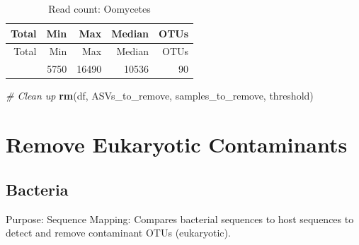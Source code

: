 \documentclass[
  11pt,
]{article}
\newenvironment{Shaded}{\begin{snugshade}}{\end{snugshade}}
\newcommand{\CommentTok}[1]{\textcolor[rgb]{0.56,0.35,0.01}{\textit{#1}}}
\newcommand{\FunctionTok}[1]{\textcolor[rgb]{0.13,0.29,0.53}{\textbf{#1}}}
\newcommand{\NormalTok}[1]{#1}
\begin{document}
\begin{longtable}[]{@{}rrrrr@{}}
\caption{Read count: Oomycetes}\tabularnewline
\toprule\noalign{}
Total & Min & Max & Median & OTUs \\
\midrule\noalign{}
\endfirsthead
\toprule\noalign{}
Total & Min & Max & Median & OTUs \\
\midrule\noalign{}
\endhead
\bottomrule\noalign{}
\endlastfoot
646360 & 5750 & 16490 & 10536 & 90 \\
\end{longtable}

\begin{Shaded}
\begin{Highlighting}[]
\CommentTok{\# Clean up}
\FunctionTok{rm}\NormalTok{(df, ASVs\_to\_remove, samples\_to\_remove, threshold)}
\end{Highlighting}
\end{Shaded}

\section{Remove Eukaryotic
Contaminants}\label{remove-eukaryotic-contaminants}

\subsection{Bacteria}\label{bacteria}

Purpose: Sequence Mapping: Compares bacterial sequences to host
sequences to detect and remove contaminant OTUs (eukaryotic).
\end{document}
